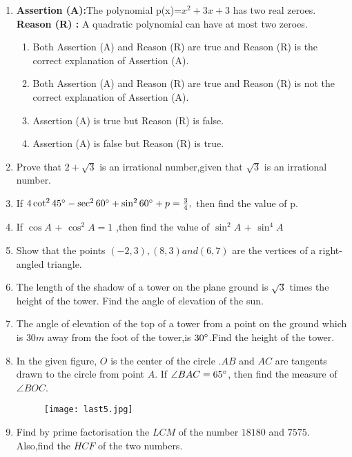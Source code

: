 \documentclass{article}
\begin{document}
\begin{enumerate}
   
	\item \textbf{Assertion (A):}The polynomial p(x)=$x^{2}+3x+3$ has two real zeroes.
		\textbf{Reason (R) :} A quadratic polynomial can have at most two zeroes.
\begin{enumerate}
\item Both Assertion (A) and Reason (R) are true and Reason (R) is the correct explanation of Assertion (A). 
\item Both Assertion (A) and Reason (R) are true and Reason (R) is not the correct explanation of Assertion (A).
\item Assertion (A) is true but Reason (R) is false.
\item Assertion (A) is false but Reason (R) is true.
\end{enumerate}

\item Prove that $ 2+\sqrt3 $ is an irrational number,given that $ \sqrt3 $ is an irrational number.

\item If $4 \cot^{2}45\degree-\sec^{2}60\degree+\sin^{2}60\degree+p=\frac{3}{4},$ then find the value of p.

\item If $\cos A$ + $\cos^{2}A = 1$ ,then find the value of $\sin^{2}A$ + $\sin^{4}A$

\item Show that the points $ (-2,3), (8,3) and (6,7) $ are the vertices of a right-angled triangle.
\item The length of the shadow of a tower on the plane ground is $ \sqrt3 $ times the height of the tower. Find the angle of elevation of the sun.

\item The angle of elevation of the top of a tower from a point on the ground which is $30 m$ away from the foot of the tower,is $30\degree$.Find the height of the tower.

\item In the given figure, $O$ is the center of the circle .$AB$ and $AC$ are tangents drawn to the circle from point $A$. If $\angle BAC = 65\degree $, then find the measure of $\angle BOC $.
	\begin{figure}[!ht]
		\centering
		\texttt{[image: last5.jpg]}
		\caption{}
		\label{fig:enter-label}
	\end{figure}
\newpage
\item Find by prime factorisation the $LCM$ of the number $18180$ and $7575$. Also,find the $HCF$ of the two numbers.


\end{enumerate}
\end{document}
